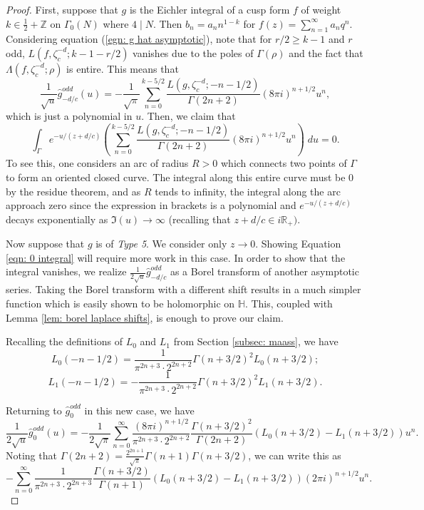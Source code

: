 \documentclass[12pt]{amsart}
\theoremstyle{definition}
\theoremstyle{plain}
\numberwithin{equation}{section}
\begin{document}
\begin{proof}
First, suppose that $g$ is the Eichler integral of a cusp form $f$ of weight $k \in \frac{1}{2}+\mathbb{Z}$ on $\Gamma_0(N)$ where $4 \mid N$. Then $b_n = a_n n^{1-k}$ for $f(z) = \sum_{n=1}^\infty a_nq^n$. 
Considering equation (\ref{egn: g hat asymptotic}), note that for $r/2 \geq k-1$ and $r$ odd, $L(f, \zeta_c^{-d};k-1-r/2)$ vanishes due to the poles of $\Gamma(\rho)$ and the fact that $\Lambda(f, \zeta_c^{-d};\rho)$ is entire. This means that 
\[
\frac{1}{\sqrt{u}}\widehat{g}_{-d/c}^{odd}(u) = -\frac{1}{\sqrt{\pi }} \sum_{n=0}^{k-5/2} \frac{ L(g, \zeta_c^{-d};-n-1/2)}{\Gamma(2n+2)}(8\pi i)^{n+1/2}u^{n},
\]
which is just a polynomial in $u$. Then, we claim that \[\int_{\Gamma} e^{-u/(z+d/c)}\left( \sum_{n=0}^{k-5/2} \frac{L(g, \zeta_c^{-d};-n-1/2)}{\Gamma(2n+2)}(8\pi i)^{n+1/2}u^{n}\right)\;du = 0.\]
To see this, one considers an arc of radius $R>0$ which connects two points of $\Gamma$ to form an oriented closed curve. The integral along this entire curve must be 0 by the residue theorem, and as $R$ tends to infinity, the integral along the arc approach zero since the expression in brackets is a polynomial and $e^{-u/(z+d/c)}$ decays exponentially as $\Im(u) \to \infty$ (recalling that $z+d/c \in i\mathbb{R}_+)$.

Now suppose that $g$ is of \emph{Type 5}. We consider only $z \to 0$. Showing Equation \ref{eqn: 0 integral} will require more work in this case. In order to show that the integral vanishes, we realize $\frac{1}{2\sqrt{u}}\widehat{g}^{odd}_{-d/c}$ as a Borel transform of another asymptotic series. Taking the Borel transform with a different shift results in a much simpler function which is easily shown to be holomorphic on $\mathbb{H}$. This, coupled with Lemma \ref{lem: borel laplace shifts}, is enough to prove our claim. 

Recalling the definitions of $L_0$ and $L_1$ from Section \ref{subsec: maass}, we have 
\[L_0(-n-1/2) =\frac{1}{\pi^{2n+3} \cdot 2^{2n+2}} \Gamma(n+3/2)^2L_0(n+3/2);
\]
\[L_1 (-n-1/2) = - \frac{1}{\pi^{2n+3} \cdot 2^{2n+2}} \Gamma(n+3/2)^2L_1(n+3/2).
\]

Returning to $\widehat{g}_0^{odd}$ in this new case, we have
\[\frac{1}{2\sqrt{u}}\widehat{g}_0^{odd}(u) = -\frac{1}{2\sqrt{\pi}}\sum_{n=0}^\infty \frac{(8\pi i)^{n+1/2}}{\pi^{2n+3} \cdot 2^{2n+2}} \frac{\Gamma(n+3/2)^2}{\Gamma(2n+2)} \left(L_0(n+3/2)-L_1(n+3/2)\right) u^n. 
\]
Noting that $\Gamma(2n+2) = \frac{2^{2n+1}}{\sqrt{\pi}} \Gamma(n+1)\Gamma(n+3/2)$, we can write this as 
\[ -\sum_{n=0}^\infty \frac{1}{\pi^{2n+3} \cdot 2^{2n+3}} \frac{\Gamma(n+3/2)}{\Gamma(n+1)} \left(L_0(n+3/2)-L_1(n+3/2)\right)(2\pi i)^{n+1/2} u^n .
\]



\end{proof}
\end{document}
